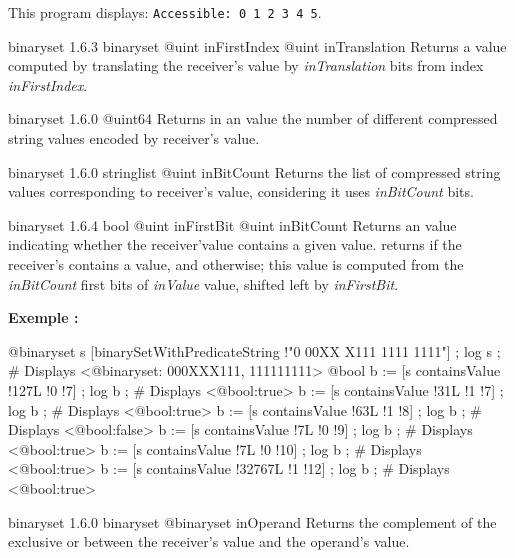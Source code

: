 This program displays: \texttt{Accessible: 0 1 2 3 4 5}.




{binaryset}
{1.6.3}
{binaryset}
{@uint inFirstIndex}
{@uint inTranslation}
{Returns a  value computed by translating the receiver's value by \emph{inTranslation} bits from index \emph{inFirstIndex}.}
{}



{binaryset}
{1.6.0}
{@uint64}
{Returns in an  value the number of different compressed string values encoded by receiver's value.}
{}




{binaryset}
{1.6.0}
{stringlist}
{@uint inBitCount}
{Returns the list of compressed string values corresponding to receiver's value, considering it uses \emph{inBitCount} bits.}
{}










{binaryset}
{1.6.4}
{bool}
{@uint inFirstBit}
{@uint inBitCount}
{Returns an  value indicating whether the receiver'value contains a given value.}
{returns  if the receiver's contains a value, and  otherwise; this value is computed from the \emph{inBitCount} first bits of \emph{inValue} value, shifted left by \emph{inFirstBit}.}


\textbf{Exemple :}
\begin{galgascode}
@binaryset s [binarySetWithPredicateString !"0 00XX X111 1111 1111"] ;
log s ; \# Displays <@binaryset: 000XXX111, 111111111>
@bool b := [s containsValue !127L !0 !7] ;
log b ; \# Displays <@bool:true>
b := [s containsValue !31L !1 !7] ;
log b ; \# Displays <@bool:true>
b := [s containsValue !63L !1 !8] ;
log b ; \# Displays <@bool:false>
b := [s containsValue !7L !0 !9] ;
log b ; \# Displays <@bool:true>
b := [s containsValue !7L !0 !10] ;
log b ; \# Displays <@bool:true>
b := [s containsValue !32767L !1 !12] ;
log b ; \# Displays <@bool:true>
\end{galgascode}








{binaryset}
{1.6.0}
{binaryset}
{@binaryset inOperand}
{Returns the complement of the exclusive or between the receiver's value and the operand's value.}
{}

